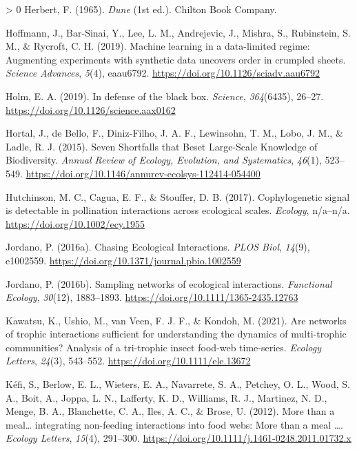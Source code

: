 \documentclass[10pt,oneside]{article}
\newlength{\cslhangindent}
\newenvironment{CSLReferences}[3] %
 {%
  \setlength{\parindent}{0pt}
  \ifodd #1 \everypar{\setlength{\hangindent}{\cslhangindent}}\ignorespaces\fi
  \ifnum #2 > 0
  \setlength{\parskip}{#2\baselineskip}
  \fi
 }%
 {}
\begin{document}
\begin{CSLReferences}{1}{0}
\leavevmode\hypertarget{ref-Herbert1965Dun}{}%
Herbert, F. (1965). \emph{Dune} (1st ed.). Chilton Book Company.

\leavevmode\hypertarget{ref-Hoffmann2019MacLea}{}%
Hoffmann, J., Bar-Sinai, Y., Lee, L. M., Andrejevic, J., Mishra, S.,
Rubinstein, S. M., \& Rycroft, C. H. (2019). Machine learning in a
data-limited regime: Augmenting experiments with synthetic data uncovers
order in crumpled sheets. \emph{Science Advances}, \emph{5}(4),
eaau6792. \url{https://doi.org/10.1126/sciadv.aau6792}

\leavevmode\hypertarget{ref-Holm2019DefBla}{}%
Holm, E. A. (2019). In defense of the black box. \emph{Science},
\emph{364}(6435), 26--27. \url{https://doi.org/10.1126/science.aax0162}

\leavevmode\hypertarget{ref-Hortal2015SevSho}{}%
Hortal, J., de Bello, F., Diniz-Filho, J. A. F., Lewinsohn, T. M., Lobo,
J. M., \& Ladle, R. J. (2015). Seven Shortfalls that Beset Large-Scale
Knowledge of Biodiversity. \emph{Annual Review of Ecology, Evolution,
and Systematics}, \emph{46}(1), 523--549.
\url{https://doi.org/10.1146/annurev-ecolsys-112414-054400}

\leavevmode\hypertarget{ref-Hutchinson2017CopSig}{}%
Hutchinson, M. C., Cagua, E. F., \& Stouffer, D. B. (2017).
Cophylogenetic signal is detectable in pollination interactions across
ecological scales. \emph{Ecology}, n/a--n/a.
\url{https://doi.org/10.1002/ecy.1955}

\leavevmode\hypertarget{ref-Jordano2016ChaEco}{}%
Jordano, P. (2016a). Chasing Ecological Interactions. \emph{PLOS Biol},
\emph{14}(9), e1002559.
\url{https://doi.org/10.1371/journal.pbio.1002559}

\leavevmode\hypertarget{ref-Jordano2016SamNet}{}%
Jordano, P. (2016b). Sampling networks of ecological interactions.
\emph{Functional Ecology}, \emph{30}(12), 1883--1893.
\url{https://doi.org/10.1111/1365-2435.12763}

\leavevmode\hypertarget{ref-Kawatsu2021AreNet}{}%
Kawatsu, K., Ushio, M., van Veen, F. J. F., \& Kondoh, M. (2021). Are
networks of trophic interactions sufficient for understanding the
dynamics of multi-trophic communities? Analysis of a tri-trophic insect
food-web time-series. \emph{Ecology Letters}, \emph{24}(3), 543--552.
\url{https://doi.org/10.1111/ele.13672}

\leavevmode\hypertarget{ref-Kefi2012MorMea}{}%
Kéfi, S., Berlow, E. L., Wieters, E. A., Navarrete, S. A., Petchey, O.
L., Wood, S. A., Boit, A., Joppa, L. N., Lafferty, K. D., Williams, R.
J., Martinez, N. D., Menge, B. A., Blanchette, C. A., Iles, A. C., \&
Brose, U. (2012). More than a meal\ldots{} integrating non-feeding
interactions into food webs: More than a meal \ldots. \emph{Ecology
Letters}, \emph{15}(4), 291--300.
\url{https://doi.org/10.1111/j.1461-0248.2011.01732.x}


\end{CSLReferences}
\end{document}
